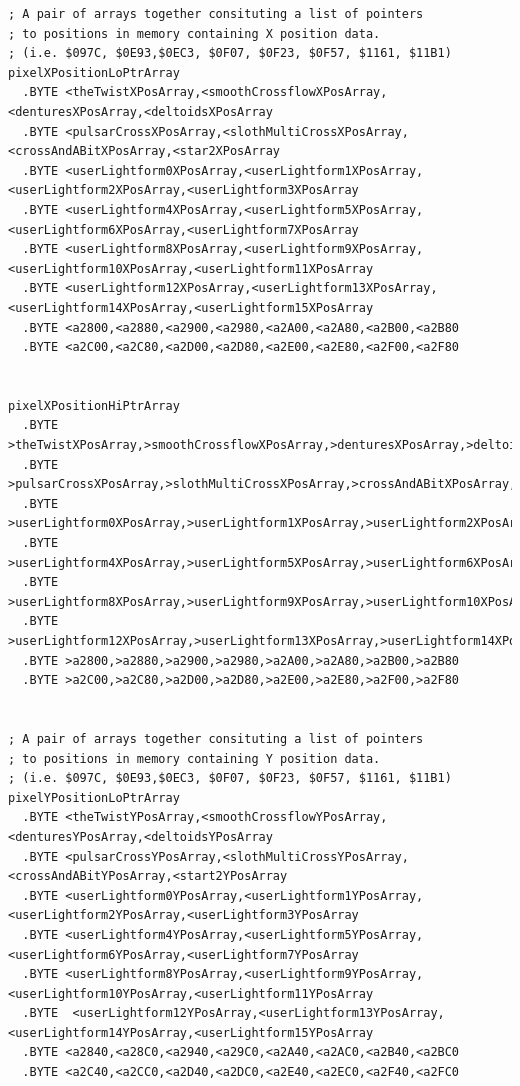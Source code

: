 \begin{lstlisting}[basicstyle=\ttfamily\scriptsize,caption = All the pattern data structures in Psychedelia organized into a set of arrays. 
We use these arrays to choose the correct user-selected pattern at painting time.]
; A pair of arrays together consituting a list of pointers
; to positions in memory containing X position data.
; (i.e. $097C, $0E93,$0EC3, $0F07, $0F23, $0F57, $1161, $11B1)
pixelXPositionLoPtrArray   
  .BYTE <theTwistXPosArray,<smoothCrossflowXPosArray,<denturesXPosArray,<deltoidsXPosArray
  .BYTE <pulsarCrossXPosArray,<slothMultiCrossXPosArray,<crossAndABitXPosArray,<star2XPosArray
  .BYTE <userLightform0XPosArray,<userLightform1XPosArray,<userLightform2XPosArray,<userLightform3XPosArray
  .BYTE <userLightform4XPosArray,<userLightform5XPosArray,<userLightform6XPosArray,<userLightform7XPosArray
  .BYTE <userLightform8XPosArray,<userLightform9XPosArray,<userLightform10XPosArray,<userLightform11XPosArray
  .BYTE <userLightform12XPosArray,<userLightform13XPosArray,<userLightform14XPosArray,<userLightform15XPosArray
  .BYTE <a2800,<a2880,<a2900,<a2980,<a2A00,<a2A80,<a2B00,<a2B80
  .BYTE <a2C00,<a2C80,<a2D00,<a2D80,<a2E00,<a2E80,<a2F00,<a2F80


pixelXPositionHiPtrArray   
  .BYTE >theTwistXPosArray,>smoothCrossflowXPosArray,>denturesXPosArray,>deltoidsXPosArray
  .BYTE >pulsarCrossXPosArray,>slothMultiCrossXPosArray,>crossAndABitXPosArray,>star2XPosArray
  .BYTE >userLightform0XPosArray,>userLightform1XPosArray,>userLightform2XPosArray,>userLightform3XPosArray
  .BYTE >userLightform4XPosArray,>userLightform5XPosArray,>userLightform6XPosArray,>userLightform7XPosArray
  .BYTE >userLightform8XPosArray,>userLightform9XPosArray,>userLightform10XPosArray,>userLightform11XPosArray
  .BYTE >userLightform12XPosArray,>userLightform13XPosArray,>userLightform14XPosArray,>userLightform15XPosArray
  .BYTE >a2800,>a2880,>a2900,>a2980,>a2A00,>a2A80,>a2B00,>a2B80
  .BYTE >a2C00,>a2C80,>a2D00,>a2D80,>a2E00,>a2E80,>a2F00,>a2F80


; A pair of arrays together consituting a list of pointers
; to positions in memory containing Y position data.
; (i.e. $097C, $0E93,$0EC3, $0F07, $0F23, $0F57, $1161, $11B1)
pixelYPositionLoPtrArray   
  .BYTE <theTwistYPosArray,<smoothCrossflowYPosArray,<denturesYPosArray,<deltoidsYPosArray
  .BYTE <pulsarCrossYPosArray,<slothMultiCrossYPosArray,<crossAndABitYPosArray,<start2YPosArray
  .BYTE <userLightform0YPosArray,<userLightform1YPosArray,<userLightform2YPosArray,<userLightform3YPosArray
  .BYTE <userLightform4YPosArray,<userLightform5YPosArray,<userLightform6YPosArray,<userLightform7YPosArray
  .BYTE <userLightform8YPosArray,<userLightform9YPosArray,<userLightform10YPosArray,<userLightform11YPosArray
  .BYTE  <userLightform12YPosArray,<userLightform13YPosArray,<userLightform14YPosArray,<userLightform15YPosArray
  .BYTE <a2840,<a28C0,<a2940,<a29C0,<a2A40,<a2AC0,<a2B40,<a2BC0
  .BYTE <a2C40,<a2CC0,<a2D40,<a2DC0,<a2E40,<a2EC0,<a2F40,<a2FC0



\end{lstlisting}
